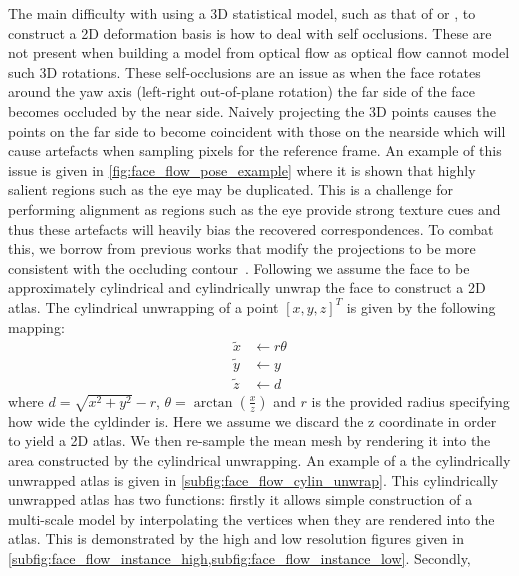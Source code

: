 The main difficulty with using a 3D statistical model, such as that of
\citet{paysan20093d} or \citet{booth2016lsfm}, to construct a 2D
deformation basis is how to deal with self occlusions. These are not present when
building a model from optical flow as optical flow cannot model such 3D rotations.
These self-occlusions are an issue as when the face rotates around the yaw axis 
(left-right out-of-plane rotation) the far side of the face becomes occluded
by the near side. Naively projecting the 3D points causes the points on the far
side to become coincident with those on the nearside which will cause artefacts
when sampling pixels for the reference frame. An example of this issue
is given in \cref{fig:face_flow_pose_example} where it is shown that highly
salient regions such as the eye may be duplicated. This is a challenge for 
performing alignment as regions such as the eye provide strong texture cues and
thus these artefacts will heavily bias the recovered correspondences. To combat
this, we borrow from previous works that modify the projections to be more
consistent with the occluding contour~\cite{Zhu:2015ur,zhu2015high,hassner2015effective}.
Following \citet{zhu2015high} we assume the face to be approximately cylindrical and
cylindrically unwrap the face to construct a 2D atlas. The cylindrical unwrapping
of a point ${[x, y, z]}^T$ is given by the following mapping:
\begin{equation}
    \begin{aligned}
        \tilde{x} &\leftarrow r \theta \\
        \tilde{y} &\leftarrow y \\
        \tilde{z} &\leftarrow d
    \end{aligned}
\end{equation}
where $d = \sqrt{x^2 + y^2} - r$,
$\theta = \arctan{\left(\frac{x}{z}\right)}$ and $r$ is the provided radius 
specifying how wide the cyldinder is. Here we assume we discard the z
coordinate in order to yield a 2D atlas.
We then re-sample the mean mesh by rendering it into the area constructed by the
cylindrical unwrapping. An example of a the cylindrically unwrapped atlas is given
in \cref{subfig:face_flow_cylin_unwrap}. 
This cylindrically unwrapped atlas has two functions: firstly it
allows simple construction of a multi-scale model by interpolating the vertices 
when they are rendered into the atlas. This is demonstrated by the high
and low resolution figures given in 
\cref{subfig:face_flow_instance_high,subfig:face_flow_instance_low}. Secondly,
